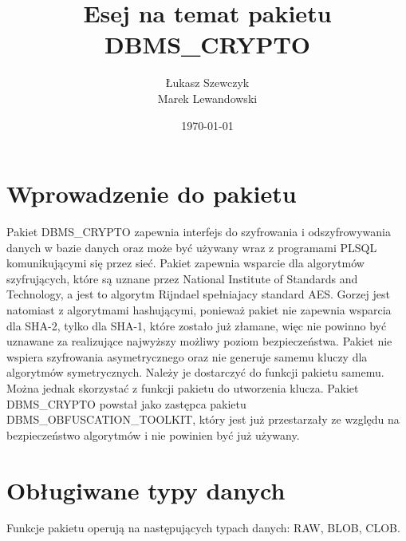 \documentclass[12pt, a4paper]{article}
\begin{document}
\title{Esej na temat pakietu DBMS\_CRYPTO}
\author{Łukasz Szewczyk\\
Marek Lewandowski }
\date{\today}



\maketitle


\section{Wprowadzenie do pakietu}
Pakiet DBMS\_CRYPTO zapewnia interfejs do szyfrowania i odszyfrowywania
danych w bazie danych oraz może być używany wraz z programami PL\/SQL
komunikującymi się przez sieć. Pakiet zapewnia wsparcie dla algorytmów
szyfrujących, które są uznane przez National Institute of Standards and
Technology, a jest to algorytm Rijndael spełniajacy standard AES. Gorzej
jest natomiast z algorytmami hashującymi, ponieważ pakiet nie zapewnia
wsparcia dla SHA-2, tylko dla SHA-1, które zostało już złamane, więc
nie powinno być uznawane za realizujące najwyższy możliwy poziom
bezpieczeństwa. Pakiet nie wspiera szyfrowania asymetrycznego oraz nie
generuje samemu kluczy dla algorytmów symetrycznych. Należy je
dostarczyć do funkcji pakietu samemu. Można jednak skorzystać z funkcji
pakietu do utworzenia klucza. Pakiet DBMS\_CRYPTO powstał jako zastępca
pakietu DBMS\_OBFUSCATION\_TOOLKIT, który jest już przestarzały ze
względu na bezpieczeństwo algorytmów i nie powinien być już używany.


\section{Obługiwane typy danych}
Funkcje pakietu operują na następujących typach danych: RAW, BLOB, CLOB.
\end{document}
